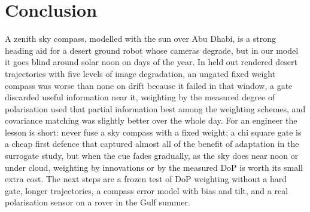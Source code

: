 \documentclass[conference]{IEEEtran}
\begin{document}
\section{Conclusion}
A zenith sky compass, modelled with the sun over Abu Dhabi, is a strong heading aid for a desert ground robot whose cameras degrade, but in our model it goes blind around solar noon on \nblindDays{} days of the year. In \nnTraj{} held out rendered desert trajectories with five levels of image degradation, an ungated fixed weight compass was worse than none on drift because it failed in that window, a gate discarded useful information near it, weighting by the measured degree of polarisation used that partial information best among the weighting schemes, and covariance matching was slightly better over the whole day. For an engineer the lesson is short: never fuse a sky compass with a fixed weight; a chi square gate is a cheap first defence that captured almost all of the benefit of adaptation in the surrogate study, but when the cue fades gradually, as the sky does near noon or under cloud, weighting by innovations or by the measured DoP is worth its small extra cost. The next steps are a frozen test of DoP weighting without a hard gate, longer trajectories, a compass error model with bias and tilt, and a real polarisation sensor on a rover in the Gulf summer.
\end{document}
